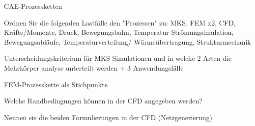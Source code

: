 \documentclass[
	ngerman,
	color = black,
	]{tudaexercise}
\begin{document}
\begin{task}[credit=18{,}5 P]{CAE-Prozessketten}
	\begin{subtask}[credit=2 P]
		Ordnen Sie die folgenden Lastfälle den "Prozessen" zu:
		MKS, FEM x2, CFD, Kräfte/Momente, Druck, Bewegungsbahn, Temperatur
		Strömungsimulation, Bewegungsabläufe, Temperaturverteilung/ Wärmeübertragung, Strukturmechanik %
	\end{subtask}
	
	\begin{subtask}[credit=4 P]
		Unterscheidungskriterium für MKS Simulationen und in welche 2 Arten die Mehrkörper analyse unterteilt werden
		+ 3 Anwendungsfälle %
	\end{subtask}	
	
	\begin{subtask}[credit=4 P]
		FEM-Prozesskette als Stichpunkte
	\end{subtask}
	
	\begin{subtask}[credit=2{,}5 P]
		Welche Randbedingungen können in der CFD angegeben werden?
	\end{subtask}
	
	\begin{subtask}[credit=4 P]
		
	\end{subtask}
	
	\begin{subtask}[credit=2 P]
		Nennen sie die beiden Formulierungen in der CFD (Netzgenerierung)
	\end{subtask}
\end{task}
\end{document}
